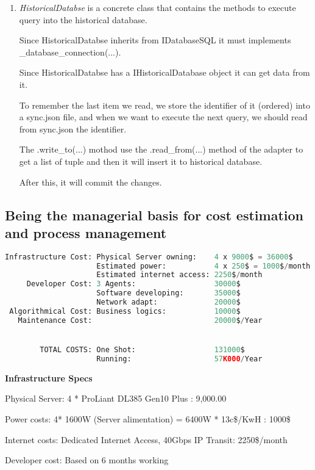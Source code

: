 \begin{enumerate}
	\item \textit{HistoricalDatabse} is a concrete class that contains the methods to execute query into the historical database.
	
     Since HistoricalDatabse inherits from IDatabaseSQL it must implements \_database\_connection(...).
    
     Since HistoricalDatabse has a IHistoricalDatabase object it can get data from it.
     
     To remember the last item we read, we store the identifier of it (ordered) into a sync.json file, and when we want to execute the next query, we should read from sync.json the identifier.
        
     The .write\_to(...) mothod use the .read\_from(...) method of the adapter to get a list of tuple and then it will insert it to historical database. 
     
     After this, it will commit the changes.
\end{enumerate}

\subsection{Being the managerial basis for cost estimation and process management}

\begin{lstlisting}[language=Python, numbers=none]
Infrastructure Cost: Physical Server owning:    4 x 9000$ = 36000$
                     Estimated power:           4 x 250$ = 1000$/month
                     Estimated internet access: 2250$/month
     Developer Cost: 3 Agents:                  30000$
                     Software developing:       35000$
                     Network adapt:             20000$
 Algorithmical Cost: Business logics:           10000$
   Maintenance Cost:                            20000$/Year


        TOTAL COSTS: One Shot:                  131000$
                     Running:                   57K000/Year 
\end{lstlisting}

\textbf{Infrastructure Specs}

Physical Server: 4 * ProLiant DL385 Gen10 Plus : 9,000.00 

Power costs:     4* 1600W (Server alimentation) = 6400W * 13c\$/KwH : 1000\$

Internet costs:  Dedicated Internet Access, 40Gbps IP Transit: 2250\$/month

Developer cost:  Based on 6 months working\\

